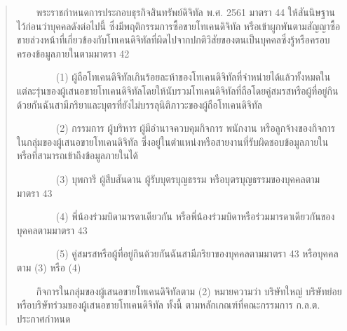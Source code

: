 \begin{quote}
\begin{thai}
~~~~พระราชกำหนดการประกอบธุรกิจสินทรัพย์ดิจิทัล พ.ศ. 2561 มาตรา 44 ให้สันนิษฐานไว้ก่อนว่าบุคคลดังต่อไปนี้ ซึ่งมีพฤติกรรมการซื้อขายโทเคนดิจิทัล หรือเข้าผูกพันตามสัญญาซื้อขายล่วงหน้าที่เกี่ยวข้องกับโทเคนดิจิทัลที่ผิดไปจากปกติวิสัยของตนเป็นบุคคลซึ่งรู้หรือครอบครองข้อมูลภายในตามมาตรา 42

~~~~~~~~(1) ผู้ถือโทเคนดิจิทัลเกินร้อยละห้าของโทเคนดิจิทัลที่จำหน่ายได้แล้วทั้งหมดในแต่ละรุ่นของผู้เสนอขายโทเคนดิจิทัลโดยให้นับรวมโทเคนดิจิทัลที่ถือโดยคู่สมรสหรือผู้ที่อยู่กินด้วยกันฉันสามีภริยาและบุตรที่ยังไม่บรรลุนิติภาวะของผู้ถือโทเคนดิจิทัล

~~~~~~~~(2) กรรมการ ผู้บริหาร ผู้มีอำนาจควบคุมกิจการ พนักงาน หรือลูกจ้างของกิจการในกลุ่มของผู้เสนอขายโทเคนดิจิทัล ซึ่งอยู่ในตำแหน่งหรือสายงานที่รับผิดชอบข้อมูลภายในหรือที่สามารถเข้าถึงข้อมูลภายในได้

~~~~~~~~(3) บุพการี ผู้สืบสันดาน ผู้รับบุตรบุญธรรม หรือบุตรบุญธรรมของบุคคลตามมาตรา 43

~~~~~~~~(4) พี่น้องร่วมบิดามารดาเดียวกัน หรือพี่น้องร่วมบิดาหรือร่วมมารดาเดียวกันของบุคคลตามมาตรา 43

~~~~~~~~(5) คู่สมรสหรือผู้ที่อยู่กินด้วยกันฉันสามีภริยาของบุคคลตามมาตรา 43 หรือบุคคลตาม (3) หรือ (4)

~~~~กิจการในกลุ่มของผู้เสนอขายโทเคนดิจิทัลตาม (2) หมายความว่า บริษัทใหญ่ บริษัทย่อย หรือบริษัทร่วมของผู้เสนอขายโทเคนดิจิทัล ทั้งนี้ ตามหลักเกณฑ์ที่คณะกรรมการ ก.ล.ต. ประกาศกำหนด
\end{thai}
\end{quote}


